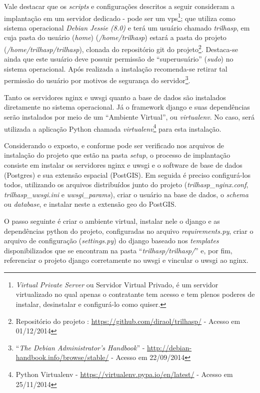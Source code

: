 Vale destacar que os \textit{scripts} e configurações descritos a seguir consideram a implantação em um servidor dedicado - pode ser um \gls{vps}\footnote{\textit{Virtual Private Server} ou Servidor Virtual Privado, é um servidor virtualizado no qual apenas o contratante tem acesso e tem plenos poderes de instalar, desinstalar e configurá-lo como quiser.}; que utiliza como sistema operacional \textit{Debian Jessie (8.0)} e terá um usuário chamado \textit{trilhasp}, em cuja pasta do usuário (\textit{home}) (\textit{/home/trilhasp}) estará a pasta do projeto (\textit{/home/trilhasp/trilhasp}), clonada do repositório git do projeto\footnote{Repositório do projeto \trilhasp: \url{https://github.com/diraol/trilhasp/} - Acesso em 01/12/2014}. Destaca-se ainda que este usuário deve possuir permissão de ``superusuário'' (\textit{sudo}) no sistema operacional. Após realizada a instalação recomenda-se retirar tal permissão do usuário por motivos de segurança do servidor\footnote{``\textit{The Debian Administrator's Handbook}'' - \url{http://debian-handbook.info/browse/stable/} - Acesso em 22/09/2014}.


Tanto os servidores \gls{nginx} e \gls{uwsgi} quanto a base de dados são instalados diretamente no sistema operacional. Já o framework \gls{django} e suas dependências serão instalados por meio de um ``Ambiente Virtual'', ou \textit{virtualenv}. No caso, será utilizada a aplicação Python chamada \textit{virtualenv}\footnote{Python Virtualenv - \url{https://virtualenv.pypa.io/en/latest/} - Acesso em 25/11/2014} para esta instalação.

Considerando o exposto, e conforme pode ser verificado nos arquivos de instalação do projeto que estão na pasta \textit{setup}, o processo de implantação consiste em instalar os servidores \gls{nginx} e \gls{uwsgi} e o software de base de dados (Postgres) e sua extensão espacial (PostGIS). Em seguida é preciso configurá-los todos, utilizando os arquivos distribuídos junto do projeto (\textit{trilhasp\_nginx.conf}, \textit{trilhasp\_uwsgi.ini} e \textit{uwsgi\_params}), criar o usuário na base de dados, o \textit{schema} ou \textit{database}, e instalar neste a extensão geo do PostGIS.

O passo seguinte é criar o ambiente virtual, instalar nele o \gls{django} e as dependências python do projeto, configuradas no arquivo \textit{requirements.py}, criar o arquivo de configuração (\textit{settings.py}) do \gls{django} baseado nos \textit{templates} disponibilizados que se encontram na pasta ``\textit{trilhasp/trilhasp/}'' e, por fim, referenciar o projeto \gls{django} corretamente no \gls{uwsgi} e vincular o \gls{uwsgi} ao \gls{nginx}.


